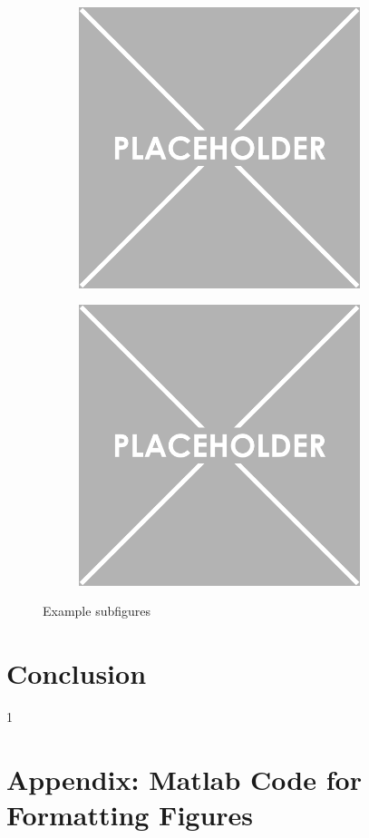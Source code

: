 \documentclass{article}
\begin{document}
\begin{figure}[H]
\begin{subfigure}[b]{0.5\textwidth}
			\end{subfigure}
			\vfill
			\vspace*{0.5cm}
			\begin{subfigure}[b]{0.5\textwidth}
				\centering
				\includegraphics[width=0.9\textwidth]{Figures/Example}
			\end{subfigure}
			\hfill
			\begin{subfigure}[b]{0.5\textwidth}
				\centering
				\includegraphics[width=0.9\textwidth]{Figures/Example}
			\end{subfigure}
			\caption{Example subfigures}
			\label{subfig}
		\end{figure}

\section{Conclusion}


\newpage
{}
\setcounter{page}1


\newpage
\section{Appendix: Matlab Code for Formatting Figures}


\end{document}

